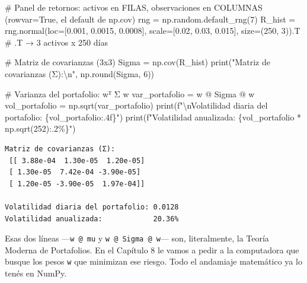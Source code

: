 \documentclass[
  spanish,
  letterpaper,
  DIV=11,
  numbers=noendperiod]{scrreprt}
\newenvironment{Shaded}{\begin{snugshade}}{\end{snugshade}}
\newcommand{\BuiltInTok}[1]{\textcolor[rgb]{0.00,0.23,0.31}{#1}}
\newcommand{\CharTok}[1]{\textcolor[rgb]{0.13,0.47,0.30}{#1}}
\newcommand{\CommentTok}[1]{\textcolor[rgb]{0.37,0.37,0.37}{#1}}
\newcommand{\DecValTok}[1]{\textcolor[rgb]{0.68,0.00,0.00}{#1}}
\newcommand{\FloatTok}[1]{\textcolor[rgb]{0.68,0.00,0.00}{#1}}
\newcommand{\NormalTok}[1]{\textcolor[rgb]{0.00,0.23,0.31}{#1}}
\newcommand{\OperatorTok}[1]{\textcolor[rgb]{0.37,0.37,0.37}{#1}}
\newcommand{\SpecialCharTok}[1]{\textcolor[rgb]{0.37,0.37,0.37}{#1}}
\newcommand{\SpecialStringTok}[1]{\textcolor[rgb]{0.13,0.47,0.30}{#1}}
\newcommand{\StringTok}[1]{\textcolor[rgb]{0.13,0.47,0.30}{#1}}
\begin{document}
\label{covarianza}
\begin{Shaded}
\begin{Highlighting}[]
\CommentTok{\# Panel de retornos: activos en FILAS, observaciones en COLUMNAS (rowvar=True, el default de np.cov)}
\NormalTok{rng }\OperatorTok{=}\NormalTok{ np.random.default\_rng(}\DecValTok{7}\NormalTok{)}
\NormalTok{R\_hist }\OperatorTok{=}\NormalTok{ rng.normal(loc}\OperatorTok{=}\NormalTok{[}\FloatTok{0.001}\NormalTok{, }\FloatTok{0.0015}\NormalTok{, }\FloatTok{0.0008}\NormalTok{],}
\NormalTok{                    scale}\OperatorTok{=}\NormalTok{[}\FloatTok{0.02}\NormalTok{, }\FloatTok{0.03}\NormalTok{, }\FloatTok{0.015}\NormalTok{],}
\NormalTok{                    size}\OperatorTok{=}\NormalTok{(}\DecValTok{250}\NormalTok{, }\DecValTok{3}\NormalTok{)).T   }\CommentTok{\# .T → 3 activos x 250 días}

\CommentTok{\# Matriz de covarianzas (3x3)}
\NormalTok{Sigma }\OperatorTok{=}\NormalTok{ np.cov(R\_hist)}
\BuiltInTok{print}\NormalTok{(}\StringTok{"Matriz de covarianzas (Σ):}\CharTok{\textbackslash{}n}\StringTok{"}\NormalTok{, np.}\BuiltInTok{round}\NormalTok{(Sigma, }\DecValTok{6}\NormalTok{))}

\CommentTok{\# Varianza del portafolio: wᵀ Σ w}
\NormalTok{var\_portafolio }\OperatorTok{=}\NormalTok{ w }\OperatorTok{@}\NormalTok{ Sigma }\OperatorTok{@}\NormalTok{ w}
\NormalTok{vol\_portafolio }\OperatorTok{=}\NormalTok{ np.sqrt(var\_portafolio)}
\BuiltInTok{print}\NormalTok{(}\SpecialStringTok{f"}\CharTok{\textbackslash{}n}\SpecialStringTok{Volatilidad diaria del portafolio: }\SpecialCharTok{\{}\NormalTok{vol\_portafolio}\SpecialCharTok{:.4f\}}\SpecialStringTok{"}\NormalTok{)}
\BuiltInTok{print}\NormalTok{(}\SpecialStringTok{f"Volatilidad anualizada:            }\SpecialCharTok{\{}\NormalTok{vol\_portafolio }\OperatorTok{*}\NormalTok{ np}\SpecialCharTok{.}\NormalTok{sqrt(}\DecValTok{252}\NormalTok{)}\SpecialCharTok{:.2\%\}}\SpecialStringTok{"}\NormalTok{)}
\end{Highlighting}
\end{Shaded}

\begin{verbatim}
Matriz de covarianzas (Σ):
 [[ 3.88e-04  1.30e-05  1.20e-05]
 [ 1.30e-05  7.42e-04 -3.90e-05]
 [ 1.20e-05 -3.90e-05  1.97e-04]]

Volatilidad diaria del portafolio: 0.0128
Volatilidad anualizada:            20.36%
\end{verbatim}

Esas dos líneas ---\texttt{w\ @\ mu} y \texttt{w\ @\ Sigma\ @\ w}---
son, literalmente, la Teoría Moderna de Portafolios. En el Capítulo 8 le
vamos a pedir a la computadora que busque los pesos \texttt{w} que
minimizan ese riesgo. Todo el andamiaje matemático ya lo tenés en NumPy.
\end{document}
